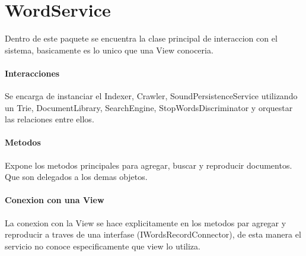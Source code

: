 \section{WordService}
Dentro de este paquete se encuentra la clase principal de interaccion con el sistema, basicamente es lo unico que una View conoceria.

\paragraph{Interacciones}
Se encarga de instanciar el Indexer, Crawler, SoundPersistenceService utilizando un Trie, DocumentLibrary, SearchEngine, StopWordsDiscriminator y orquestar las relaciones entre ellos.

\paragraph{Metodos}
Expone los metodos principales para agregar, buscar y reproducir documentos. Que son delegados a los demas objetos.

\paragraph{Conexion con una View}
La conexion con la View se hace explicitamente en los metodos par agregar y reproducir a traves de una interfase (IWordsRecordConnector), de esta manera el servicio no conoce especificamente que view lo utiliza.


